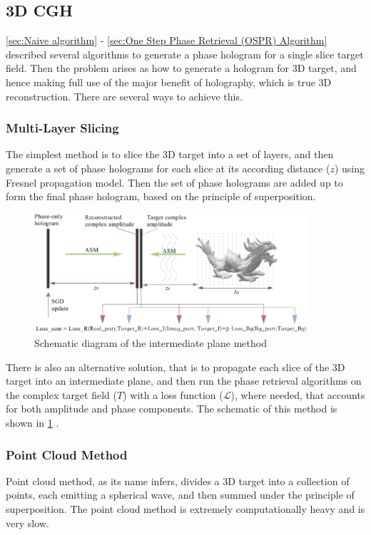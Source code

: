 \subsection{3D CGH}
\cref{sec:Naive algorithm} - \cref{sec:One Step Phase Retrieval (OSPR) Algorithm} described several algorithms to generate a phase hologram for a single slice target field. Then the problem arises as how to generate a hologram for 3D target, and hence making full use of the major benefit of holography, which is true 3D reconstruction. There are several ways to achieve this.

\subsubsection{Multi-Layer Slicing}
The simplest method is to slice the 3D target into a set of layers, and then generate a set of phase holograms for each slice at its according distance ($z$) using Fresnel propagation model. Then the set of phase holograms are added up to form the final phase hologram, based on the principle of superposition.

\begin{figure}[H]
  \centering
  \includegraphics[width=0.9\textwidth]{intermediate_plane.png}
  \caption{Schematic diagram of the intermediate plane method \cite{Chen2021}}
  \label{fig:intermediate_plane}
\end{figure}

There is also an alternative solution, that is to propagate each slice of the 3D target into an intermediate plane, and then run the phase retrieval algorithms on the complex target field ($T$) with a loss function ($\mathcal{L} $), where needed, that accounts for both amplitude and phase components. The schematic of this method is shown in \cref{fig:intermediate_plane} \cite{Chen2021}.


\subsubsection{Point Cloud Method}
Point cloud method, as its name infers, divides a 3D target into a collection of points, each emitting a spherical wave, and then summed under the principle of superposition. The point cloud method is extremely computationally heavy and is very slow.



